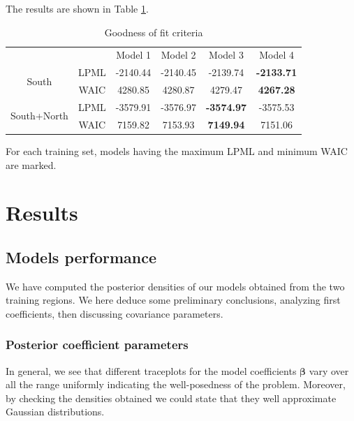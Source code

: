 \documentclass[12pt]{article}
\begin{document}
The results are shown in Table \ref{gof_results}.


\renewcommand{\baselinestretch}{1.5}
\begin{table}[H]
\centering
\begin{tabular}{cccccc}
&& Model 1 & Model 2 & Model 3 & Model 4 \\ \cline{2-6}
\multicolumn{1}{c|}{\multirow{2}{*}{South}} & \multicolumn{1}{c|}{LPML} & -2140.44 & -2140.45 & -2139.74 & \multicolumn{1}{c|}{\textbf{-2133.71}} \\
\multicolumn{1}{c|}{} & \multicolumn{1}{c|}{WAIC} & 4280.85 & 4280.87 & 4279.47 & \multicolumn{1}{c|}{\textbf{4267.28}} \\
\cline{2-6}
\multicolumn{1}{c|}{\multirow{2}{*}{South+North}} & \multicolumn{1}{c|}{LPML} & -3579.91 & -3576.97 & \textbf{-3574.97} & \multicolumn{1}{c|}{-3575.53} \\
\multicolumn{1}{c|}{} & \multicolumn{1}{c|}{WAIC} & 7159.82 & 7153.93 & \textbf{7149.94} & \multicolumn{1}{c|}{7151.06} \\
\cline{2-6}
\end{tabular}
\caption{Goodness of fit criteria}\label{gof_results}
\end{table}
 \renewcommand{\baselinestretch}{1}

\noindent
For each training set, models having the maximum LPML and minimum WAIC are marked.

\section{Results}
\subsection{Models performance}

\noindent
We have computed the posterior densities of our models obtained from the two training regions. We here deduce some preliminary conclusions, analyzing first coefficients, then discussing covariance parameters.\\

\subsubsection{Posterior coefficient parameters}
	In general, we see that different traceplots for the model coefficients $\boldsymbol{\beta}$ vary over all the range uniformly indicating the well-posedness of the problem. Moreover, by checking the densities obtained we could state that they well approximate Gaussian distributions.\\
	
\end{document}
